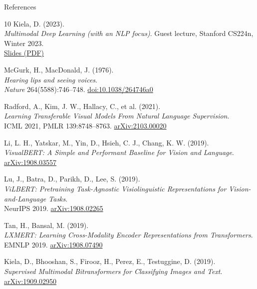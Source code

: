 \begin{frame}[allowframebreaks]{References}
  \small
  \begin{thebibliography}{10}
      Kiela, D. (2023). \\
      \emph{Multimodal Deep Learning (with an NLP focus)}. Guest lecture, Stanford CS224n, Winter 2023.\\
      \href{https://web.stanford.edu/class/archive/cs/cs224n/cs224n.1234/slides/Multimodal-Deep-Learning-CS224n-Kiela.pdf}{Slides (PDF)}

      McGurk, H., MacDonald, J. (1976). \\
      \emph{Hearing lips and seeing voices}.\\
      \emph{Nature} 264(5588):746--748. \href{https://doi.org/10.1038/264746a0}{doi:10.1038/264746a0}

      Radford, A., Kim, J. W., Hallacy, C., et al. (2021). \\
      \emph{Learning Transferable Visual Models From Natural Language Supervision}.\\
      ICML 2021, PMLR 139:8748--8763. \href{https://arxiv.org/abs/2103.00020}{arXiv:2103.00020}

      Li, L. H., Yatskar, M., Yin, D., Hsieh, C. J., Chang, K. W. (2019). \\
      \emph{VisualBERT: A Simple and Performant Baseline for Vision and Language}.\\
      \href{https://arxiv.org/abs/1908.03557}{arXiv:1908.03557}

      Lu, J., Batra, D., Parikh, D., Lee, S. (2019). \\
      \emph{ViLBERT: Pretraining Task-Agnostic Visiolinguistic Representations for Vision-and-Language Tasks}.\\
      NeurIPS 2019. \href{https://arxiv.org/abs/1908.02265}{arXiv:1908.02265}

      Tan, H., Bansal, M. (2019). \\
      \emph{LXMERT: Learning Cross-Modality Encoder Representations from Transformers}.\\
      EMNLP 2019. \href{https://arxiv.org/abs/1908.07490}{arXiv:1908.07490}

      Kiela, D., Bhooshan, S., Firooz, H., Perez, E., Testuggine, D. (2019). \\
      \emph{Supervised Multimodal Bitransformers for Classifying Images and Text}.\\
      \href{https://arxiv.org/abs/1909.02950}{arXiv:1909.02950}


\end{thebibliography}
\end{frame}
